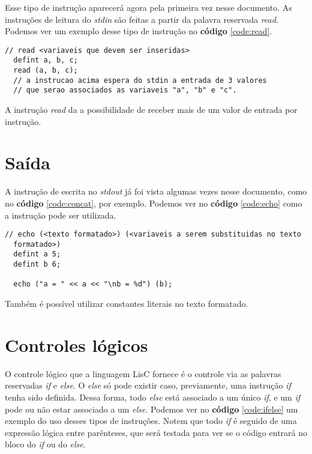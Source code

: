 \documentclass[
  12pt,				%
  oneside,			%
  a4paper,			%
  english,			%
  french,				%
  spanish,			%
  brazil,				%
]{abntex2}
\begin{document}
Esse tipo de instrução aparecerá agora pela primeira vez nesse
documento. As instruções de leitura do \emph{stdin} são feitas a
partir da palavra reservada \emph{read}. Podemos ver um exemplo desse
tipo de instrução no \textbf{código} \ref{code:read}.

\begin{lstlisting}[label=code:read,caption=Exemplo de código da
  instrução read.]
  // read <variaveis que devem ser inseridas>
  defint a, b, c;
  read (a, b, c);
  // a instrucao acima espera do stdin a entrada de 3 valores
  // que serao associados as variaveis "a", "b" e "c".
\end{lstlisting}
A instrução \emph{read} da a possibilidade de receber mais de um valor
de entrada por instrução.

\section{Saída}
\label{sec:saida}

A instrução de escrita no \emph{stdout} já foi vista algumas vezes
nesse documento, como no \textbf{código} \ref{code:concat}, por
exemplo. Podemos ver no \textbf{código} \ref{code:echo} como a
instrução pode ser utilizada.

\begin{lstlisting}[label=code:echo,caption=Exemplo de código da
  instrução echo]
  // echo (<texto formatado>) (<variaveis a serem substituidas no texto
  formatado>)
  defint a 5;
  defint b 6;
  
  echo ("a = " << a << "\nb = %d") (b);
\end{lstlisting}

Também é possível utilizar constantes literais no texto formatado.

\section{Controles lógicos}
\label{sec:controles-logicos}

O controle lógico que a linguagem LisC fornece é o controle via as
palavras reservadas \emph{if} e \emph{else}. O \emph{else} só pode
existir caso, previamente, uma instrução \emph{if} tenha sido
definida. Dessa forma, todo \emph{else} está associado a um único
\emph{if}, e um \emph{if} pode ou não estar associado a um
\emph{else}. Podemos ver no \textbf{código} \ref{code:ifelse} um
exemplo do uso desses tipos de instruções. Notem que todo \emph{if} é
seguido de uma expressão lógica entre parênteses, que será testada
para ver se o código entrará no bloco do \emph{if} ou do \emph{else}.
\end{document}
